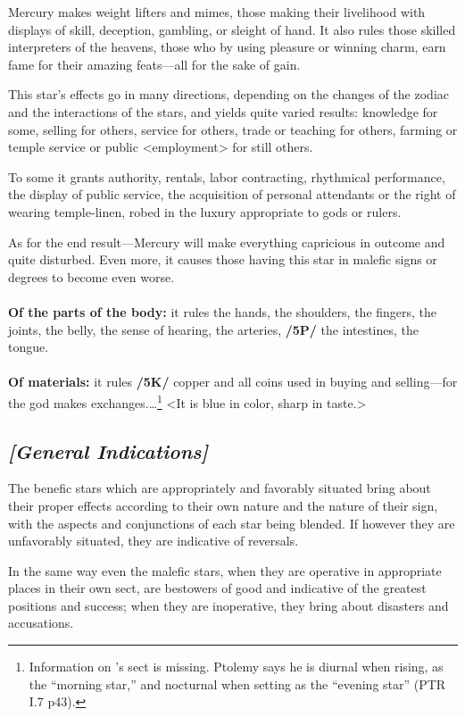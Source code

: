 Mercury makes weight lifters and mimes, those making their livelihood with displays of skill, deception, gambling, or sleight of hand. It also rules those skilled interpreters of the heavens, those who by using pleasure or winning charm, earn fame for their amazing feats—all for the sake of gain. 

\mndl[0.2cm]
This star’s effects go in many directions, depending on the changes of the zodiac and the interactions of the stars, and yields quite varied results: knowledge for some, selling for others, service for others, trade or teaching for others, farming or temple service or public <employment> for still others. 

To some it grants authority, rentals, labor contracting, rhythmical performance, the display of public service,
the acquisition of personal attendants or the right of wearing temple-linen, robed in the luxury appropriate
to gods or rulers. 

\mndl[0.2cm]
As for the end result—Mercury will make everything capricious in outcome and quite disturbed. Even more, it causes those having this star in malefic signs or degrees to become even worse. \\
\\
\textbf{Of the parts of the body:} it rules the hands, the shoulders, the fingers, the joints, the belly, the sense of hearing, the arteries, \textbf{/5P/} the intestines, the tongue. \\
\\
\textbf{Of materials:} it rules \textbf{/5K/} copper and all coins used in buying and selling—for the god makes exchanges.\ldots\footnote{Information on \Mercury's sect is missing. Ptolemy says he is diurnal when rising, as the ``morning star,'' and nocturnal when setting as the ``evening star'' (PTR I.7 p43).} <It is blue in color, sharp in taste.>

\secbr
\subsection{\textit{[General Indications]}}
\mndl[0.2cm]
The  benefic stars  which are appropriately and favorably situated bring about their proper effects according to their own nature and the nature of their sign, with the aspects and conjunctions of each star being blended. If however they are unfavorably situated, they are indicative of reversals. 

\mnmb[0.2cm] 
In the same way even the  malefic stars, when they are operative in appropriate places in their own sect, are bestowers of good and indicative of the greatest positions and success; when they are inoperative, they bring about disasters and accusations.

